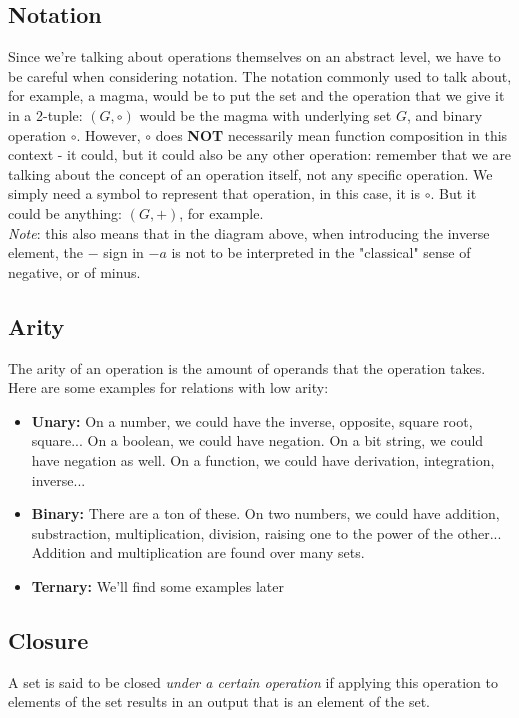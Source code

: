 \documentclass{article}
\begin{document}
\subsection{Notation}
Since we're talking about operations themselves on an abstract level, we have to be careful when considering notation. The notation commonly used to talk about, for example, a magma, would be to put the set and the operation that we give it in a 2-tuple: \((G, \circ)\) would be the magma with underlying set \(G\), and binary operation \(\circ\). However, \(\circ\) does \textbf{NOT} necessarily mean function composition in this context - it could, but it could also be any other operation: remember that we are talking about the concept of an operation itself, not any specific operation. We simply need a symbol to represent that operation, in this case, it is \(\circ\). But it could be anything: \((G, +)\), for example. \\
\emph{Note}: this also means that in the diagram above, when introducing the inverse element, the \(-\) sign in \(-a\) is not to be interpreted in the "classical" sense of negative, or of minus.
\subsection{Arity}
The arity of an operation is the amount of operands that the operation takes. Here are some examples for relations with low arity:
\begin{itemize}
	\item \textbf{Unary:} On a number, we could have the inverse, opposite, square root, square... On a boolean, we could have negation. On a bit string, we could have negation as well. On a function, we could have derivation, integration, inverse...
	\item \textbf{Binary:} There are a ton of these. On two numbers, we could have addition, substraction, multiplication, division, raising one to the power of the other... Addition and multiplication are found over many sets.
	\item \textbf{Ternary:} We'll find some examples later
\end{itemize}
\subsection{Closure}
A set is said to be closed \emph{under a certain operation} if applying this operation to elements of the set results in an output that is an element of the set. \\
\end{document}
